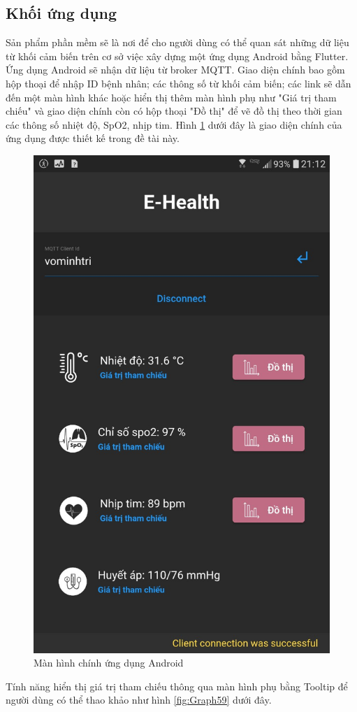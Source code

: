 \documentclass{report}
\begin{document}
\subsection{Khối ứng dụng}
Sản phẩm phần mềm sẽ là nơi để cho người dùng có thể quan sát những dữ liệu từ khối cảm biến trên cơ sở việc xây dựng một ứng dụng Android bằng Flutter. Ứng dụng Android sẽ nhận dữ liệu từ broker MQTT. Giao diện chính bao gồm hộp thoại để nhập ID bệnh nhân; các thông số từ khối cảm biến; các link sẽ dẫn đến một màn hình khác hoặc hiển thị thêm màn hình phụ như "Giá trị tham chiếu" và giao diện chính còn có hộp thoại "Đồ thị" để vẽ đồ thị theo thời gian các thông số nhiệt độ, SpO2, nhịp tim. Hình \ref{fig:Graph58} dưới đây là giao diện chính của ứng dụng được thiết kế trong đề tài này.
\begin{figure}[h]
	\centering
	\includegraphics[scale = 0.3]{fig58.png}
	\caption{Màn hình chính ứng dụng Android}
	\label{fig:Graph58}
\end{figure}
\newpage
Tính năng hiển thị giá trị tham chiếu thông qua màn hình phụ bằng Tooltip để người dùng có thể thao khảo như hình \ref{fig:Graph59} dưới đây. 
\end{document}
